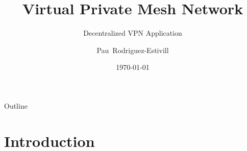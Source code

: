 \documentclass{beamer}
\title[VPMN]{Virtual Private Mesh Network} %
\subtitle{Decentralized VPN Application} %
\author[Pau]{Pau~Rodriguez-Estivill}
\institute[EPSC UPC] %
{
  Escola Polit\`ecnica Superior de Castelldefels\\
  Universitat Polit\`ecnica de Catalunya
}
\date[date] %
{\today}
\begin{document}
\begin{frame}
  \titlepage
\end{frame}

\begin{frame}{Outline}
  \tableofcontents
\end{frame}



\section{Introduction}
\end{document}

